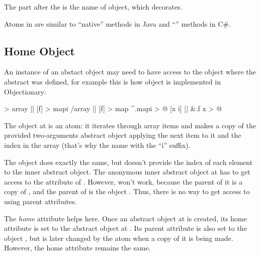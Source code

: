 The  part after the \ff{/} is the name of
object, which  decorates.

Atoms in \eo{} are similar to ``native'' methods in Java and ``'' methods
in C\#.

\subsection{Home Object}

An instance of an abstact object may need to have access to the
object where the abstract was defined, for example this is
how object  is implemented in Objectionary:

\begin{ffcode}
[] > array |$\label{ln:array-parent}$|
  [f] > mapi /array |$\label{ln:array-map}$|
  [f] > map
    ^.mapi > @
      [x i] |$\label{ln:map-inner}$|
        &.f x > @
\end{ffcode}

The object  at  is an atom:
it iterates through array items and makes
a copy of the provided two-arguments abstract object  applying the next
item to it and the index in the array (that's why the name with the ``i'' suffix).

The object  does exactly the same, but doesn't provide the
index of each element to the inner abstract object.
The anonymous inner abstract object at 
has to get access to the attribute  of .
However,  won't work, because the parent of it is a copy of , and the
parent of  is the object .
Thus, there is no way to get access
to  using parent attributes.

The \emph{home} attribute \ff{\&} helps here.
Once an abstract object at  is created, its
home attribute is set to the abstract object  at .
Its parent attribute \ff{\^{}} is also set to the object ,
but is later changed by the atom  when a copy of it is being made.
However, the home attribute remains the same.
